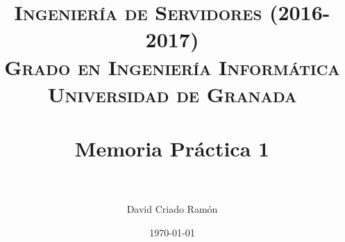 



\title{	
\normalfont \normalsize 
\textsc{\textbf{Ingeniería de Servidores (2016-2017)} \\ Grado en Ingeniería Informática \\ Universidad de Granada} \\ [25pt] %
\horrule{0.5pt} \\[0.4cm] %
\huge Memoria Práctica 1 \\ %
\horrule{2pt} \\[0.5cm] %
}

\author{David Criado Ramón} %

\date{\normalsize\today} %




\maketitle %

\newpage %

\tableofcontents %

\listoffigures

\listoftables

\newpage


